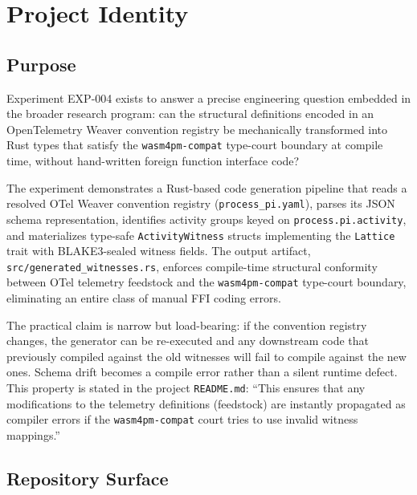 
\section{Project Identity}
\label{sec:otel-weaver-exp-004-registry-to-witness-identity}

\subsection{Purpose}
\label{sec:otel-weaver-exp-004-registry-to-witness-purpose}

Experiment EXP-004 exists to answer a precise engineering question embedded in the broader
research program: can the structural definitions encoded in an OpenTelemetry Weaver
convention registry be mechanically transformed into Rust types that satisfy the
\texttt{wasm4pm-compat} type-court boundary at compile time, without hand-written foreign
function interface code?

The experiment demonstrates a Rust-based code generation pipeline that reads a resolved
OTel Weaver convention registry (\texttt{process\_pi.yaml}), parses its JSON schema
representation, identifies activity groups keyed on \texttt{process.pi.activity}, and
materializes type-safe \texttt{ActivityWitness} structs implementing the \texttt{Lattice}
trait with BLAKE3-sealed witness fields. The output artifact,
\texttt{src/generated\_witnesses.rs}, enforces compile-time structural conformity between
OTel telemetry feedstock and the \texttt{wasm4pm-compat} type-court boundary, eliminating
an entire class of manual FFI coding errors.

The practical claim is narrow but load-bearing: if the convention registry changes, the
generator can be re-executed and any downstream code that previously compiled against the
old witnesses will fail to compile against the new ones. Schema drift becomes a compile
error rather than a silent runtime defect. This property is stated in the project
\texttt{README.md}: ``This ensures that any modifications to the telemetry definitions
(feedstock) are instantly propagated as compiler errors if the \texttt{wasm4pm-compat}
court tries to use invalid witness mappings.''

\subsection{Repository Surface}
\label{sec:otel-weaver-exp-004-registry-to-witness-repo}

